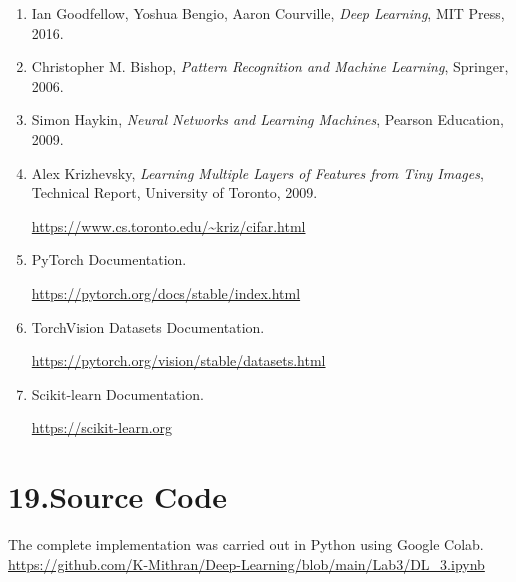 \documentclass[11pt,a4paper]{article}
\begin{document}
\begin{enumerate}

\item Ian Goodfellow,
Yoshua Bengio,
Aaron Courville,
\textit{Deep Learning},
MIT Press,
2016.

\item Christopher M. Bishop,
\textit{Pattern Recognition and Machine Learning},
Springer,
2006.

\item Simon Haykin,
\textit{Neural Networks and Learning Machines},
Pearson Education,
2009.

\item Alex Krizhevsky,
\textit{Learning Multiple Layers of Features from Tiny Images},
Technical Report, University of Toronto,
2009.

\url{https://www.cs.toronto.edu/~kriz/cifar.html}

\item PyTorch Documentation.

\url{https://pytorch.org/docs/stable/index.html}

\item TorchVision Datasets Documentation.

\url{https://pytorch.org/vision/stable/datasets.html}

\item Scikit-learn Documentation.

\url{https://scikit-learn.org}

\end{enumerate}

\section*{19.Source Code}

The complete implementation was carried out in Python using Google Colab.
\\[10pt]
\url{https://github.com/K-Mithran/Deep-Learning/blob/main/Lab3/DL_3.ipynb}
\\[10pt]

\vfill
\end{document}

